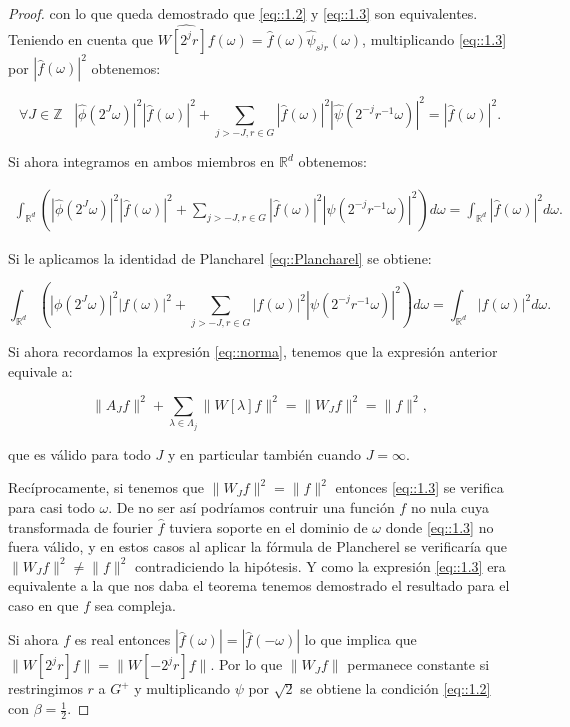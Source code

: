 \begin{proof}
\noindent con lo que queda demostrado que \eqref{eq::1.2} y \eqref{eq::1.3} son equivalentes. Teniendo en cuenta que $\widehat{W\left[2^jr\right]f}(\omega)=\widehat{f}(\omega)\widehat{\psi}_{s^jr}(\omega)$, multiplicando \eqref{eq::1.3} por $|\widehat{f}(\omega)|^2$ obtenemos: 

$$\forall J \in \mathbb{Z} \; \; \; \left|\widehat{\phi}\left(2^J\omega\right)\right|^2 \left|\widehat{f}(\omega)\right|^2 + \sum_{j>-J,r\in G}\left|\widehat{f}(\omega)\right|^2\left|\widehat{\psi}\left(2^{-j}r^{-1}\omega\right)\right|^2=\left|\widehat{f}(\omega)\right|^2.$$

\noindent Si ahora integramos en ambos miembros en $\mathbb{R}^d$ obtenemos: 

     \begin{align*}
        \int_{\mathbb{R}^d}\left(\left|\widehat{\phi}\left(2^J\omega\right)\right|^2 \left|\widehat{f}(\omega)\right|^2 + \sum_{j>-J,r\in G}\left|\widehat{f}(\omega)\right|^2\left|\widehat{\psi}\left(2^{-j}r^{-1}\omega\right)\right|^2 \right) d\omega=\int_{\mathbb{R}^d}\left|\widehat{f}(\omega)\right|^2 d\omega.
    \end{align*}

\noindent Si le aplicamos la identidad de Plancharel \eqref{eq::Plancharel} se obtiene:

$$\int_{\mathbb{R}^d}\left(\left|\phi\left(2^J\omega\right)\right|^2 \left|f(\omega)\right|^2 + \sum_{j>-J,r\in G}\left|f(\omega)\right|^2\left|\psi\left(2^{-j}r^{-1}\omega\right)\right|^2 \right) d\omega=\int_{\mathbb{R}^d}\left|f(\omega)\right|^2 d\omega.$$

\noindent Si ahora recordamos la expresión \eqref{eq::norma}, tenemos que la expresión anterior equivale a:

$$\|A_Jf\|^2+\sum_{\lambda \in \Lambda_j} \|W[\lambda]f\|^2=\|W_J f\|^2=\|f\|^2,$$

\noindent que es válido para todo $J$ y en particular también cuando $J=\infty$.

\medskip

\noindent Recíprocamente, si tenemos que $\|W_J f\|^2=\|f\|^2$ entonces \eqref{eq::1.3} se verifica para casi todo $\omega$. De no ser así podríamos contruir una función $f$ no nula cuya transformada de fourier $\widehat{f}$ tuviera soporte en el dominio de $\omega$ donde \eqref{eq::1.3} no fuera válido, y en estos casos al aplicar la fórmula de Plancherel se verificaría que $\|W_J f\|^2 \neq \|f\|^2$ contradiciendo la hipótesis. Y como la expresión \eqref{eq::1.3} era equivalente a la que nos daba el teorema tenemos demostrado el resultado para el caso en que $f$ sea compleja. 

\medskip

\noindent Si ahora $f$ es real entonces $|\widehat{f}(\omega)|=|\widehat{f}(-\omega)|$ lo que implica que $\|W[2^jr]f\|=\|W[-2^jr]f\|$. Por lo que $\|W_J f\|$ permanece constante si restringimos $r$ a $G^+$ y multiplicando $\psi$ por $\sqrt{2}$ se obtiene la condición \eqref{eq::1.2} con $\beta=\frac{1}{2}$. \qedhere

\end{proof}

